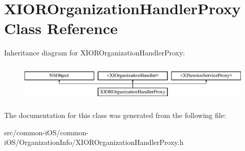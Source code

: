 \hypertarget{interface_x_i_o_r_organization_handler_proxy}{}\section{X\+I\+O\+R\+Organization\+Handler\+Proxy Class Reference}
\label{interface_x_i_o_r_organization_handler_proxy}
Inheritance diagram for X\+I\+O\+R\+Organization\+Handler\+Proxy\+:\begin{figure}[H]
\begin{center}
\leavevmode
\includegraphics[height=1.866667cm]{interface_x_i_o_r_organization_handler_proxy}
\end{center}
\end{figure}


The documentation for this class was generated from the following file\+:\begin{DoxyCompactItemize}
\item 
src/common-\/i\+O\+S/common-\/i\+O\+S/\+Organization\+Info/X\+I\+O\+R\+Organization\+Handler\+Proxy.\+h\end{DoxyCompactItemize}
